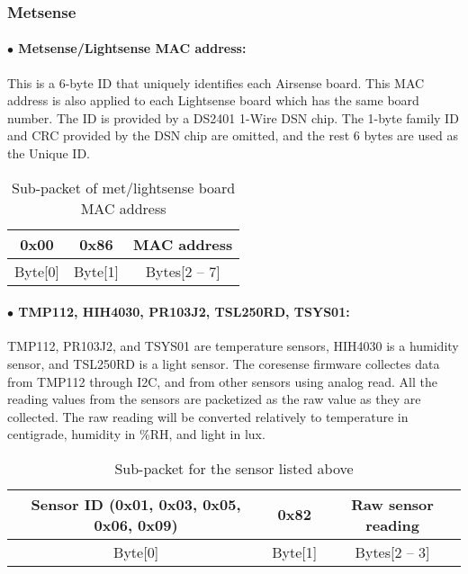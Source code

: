 
\subsubsection{Metsense}

\paragraph{$\bullet$ Metsense/Lightsense MAC address: }

This is a 6-byte ID that uniquely identifies each Airsense board. This MAC address is also applied to each Lightsense board which has the same board number. The ID is provided by a DS2401 1-Wire DSN chip. The 1-byte family ID and CRC provided by the DSN chip are omitted, and the rest 6 bytes are used as the Unique ID.


\begin{table}[h!]
    \centering
    \caption{Sub-packet of met/lightsense board MAC address}
    \begin{tabular}{|c|c|c|}
        \hline
        \rowcolor{black!8}
        \textbf{0x00} & \textbf{0x86} & \textbf{MAC address} \\
        \hline
        Byte[0] & Byte[1] & Bytes[2 -- 7]\\ \hline
    \end{tabular}
\end{table}
\par

\paragraph{$\bullet$ TMP112, HIH4030, PR103J2, TSL250RD, TSYS01:}

TMP112, PR103J2, and TSYS01 are temperature sensors, HIH4030 is a humidity sensor, and TSL250RD is a light sensor.
The coresense firmware collectes data from TMP112 through I2C, and from other sensors using analog read.
All the reading values from the sensors are packetized as the raw value as they are collected.
The raw reading will be converted relatively to temperature in centigrade, humidity in \%RH, and light in lux.

\begin{table}[h!]
    \centering
    \caption{Sub-packet for the sensor listed above}
    \begin{tabular}{|c|c|c|}
        \hline
        \rowcolor{black!8}
        \textbf{Sensor ID} (0x01, 0x03, 0x05, 0x06, 0x09) & \textbf{0x82} & \textbf{Raw sensor reading} \\
        \hline
        Byte[0] & Byte[1] & Bytes[2 -- 3]\\ \hline
    \end{tabular}
\end{table}


